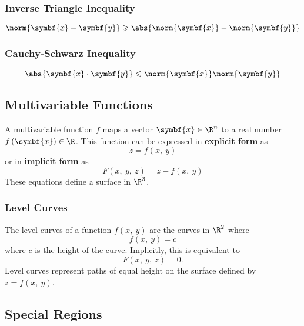 \documentclass{article}
\begin{document}
\subsubsection{Inverse Triangle Inequality}
\begin{equation*}
    \norm{\symbf{x} - \symbf{y}} \geqslant \abs{\norm{\symbf{x}} - \norm{\symbf{y}}}
\end{equation*}
\subsubsection{Cauchy-Schwarz Inequality}
\begin{equation*}
    \abs{\symbf{x} \cdot \symbf{y}} \leqslant \norm{\symbf{x}} \norm{\symbf{y}}
\end{equation*}
\subsection{Multivariable Functions}
A multivariable function \(f\) maps a vector \(\symbf{x} \in \R^n\) to
a real number \(f \left( \symbf{x} \right) \in \R\). This function can
be expressed in \textbf{explicit form} as
\begin{equation*}
    z = f\left( x,\: y \right)
\end{equation*}
or in \textbf{implicit form} as
\begin{equation*}
    F\left( x,\: y,\: z \right) = z - f\left( x,\: y \right)
\end{equation*}
These equations define a surface in \(\R^3\).
\subsubsection{Level Curves}
The level curves of a function \(f \left( x,\: y \right)\) are the
curves in \(\R^2\) where
\begin{equation*}
    f \left( x,\: y \right) = c
\end{equation*}
where \(c\) is the height of the curve. Implicitly, this is equivalent to
\begin{equation*}
    F\left( x,\: y,\: z \right) = 0.
\end{equation*}
Level curves represent paths of equal height on the surface defined by \(z = f \left( x,\: y \right)\).
\subsection{Special Regions}
\end{document}
